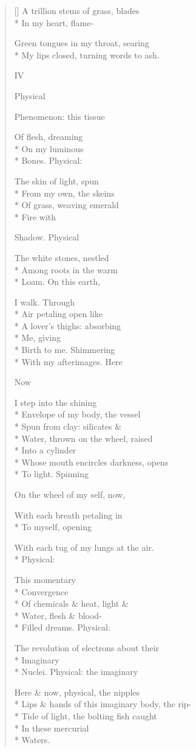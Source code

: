 \begin{verse}[\versewidth]
A trillion stems of grass, blades\\*
In my heart, flame-

Green tongues in my throat, searing\\*
My lips closed, turning words to ash.

                        IV

Physical

Phenomenon:     this tissue

Of flesh, dreaming\\*
On my luminous\\*
Bones.   Physical:

The skin of light, spun\\*
From my own, the skeins\\*
Of grass, weaving emerald\\*
Fire with

Shadow.     Physical

The white stones, nestled\\*
Among roots in the warm\\*
Loam.   On this earth,

I walk.   Through\\*
Air petaling open like\\*
A lover's thighs:   absorbing\\*
Me, giving\\*
Birth to me.   Shimmering\\*
With my afterimages.     Here

Now

I step into the shining\\*
Envelope of my body, the vessel\\*
Spun from clay: silicates \&\\*
Water, thrown on the wheel, raised\\*
Into a cylinder\\*
Whose mouth encircles darkness, opens\\*
To light.   Spinning

On the wheel of my self, now,

With each breath petaling in\\*
To myself, opening

With each tug of my lungs at the air.\\*
Physical:

This momentary\\*
Convergence\\*
Of chemicals \& heat, light \&\\*
Water, flesh \& blood-\\*
Filled dreams.   Physical:

The revolution of electrons about their\\*
Imaginary\\*
Nuclei.     Physical:     the imaginary

Here \& now, physical, the nipples\\*
Lips \& hands of this imaginary body,   the rip-\\*
Tide of light, the bolting fish caught\\*
In these mercurial\\*
Waters.
\end{verse}
